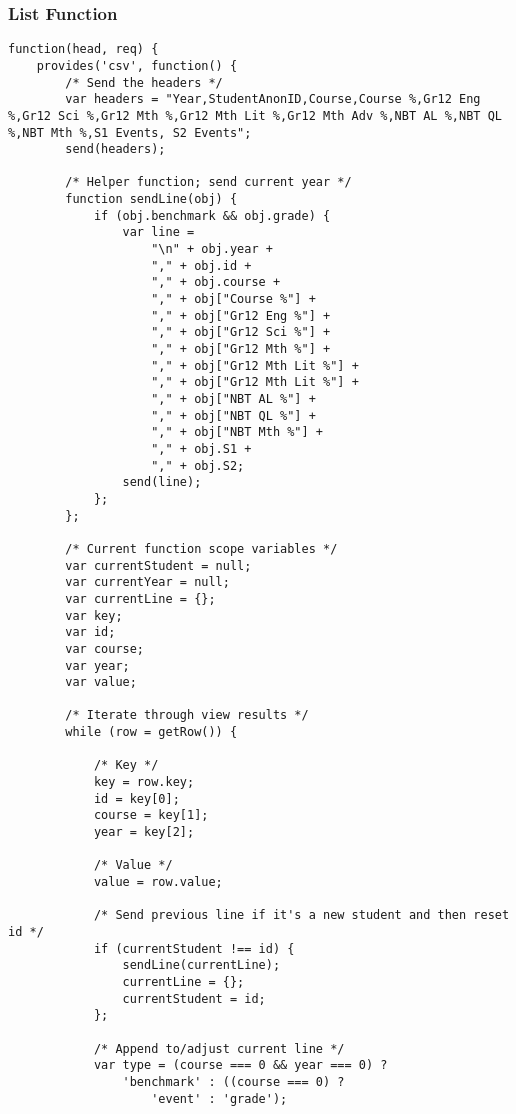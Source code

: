 \subsubsection{List Function}
\label{3-way-join-list-function}
\begin{verbatim}
function(head, req) {
    provides('csv', function() {
        /* Send the headers */
        var headers = "Year,StudentAnonID,Course,Course %,Gr12 Eng %,Gr12 Sci %,Gr12 Mth %,Gr12 Mth Lit %,Gr12 Mth Adv %,NBT AL %,NBT QL %,NBT Mth %,S1 Events, S2 Events";
        send(headers);

        /* Helper function; send current year */
        function sendLine(obj) {
            if (obj.benchmark && obj.grade) {
                var line =
                    "\n" + obj.year +
                    "," + obj.id +
                    "," + obj.course +
                    "," + obj["Course %"] +
                    "," + obj["Gr12 Eng %"] +
                    "," + obj["Gr12 Sci %"] +
                    "," + obj["Gr12 Mth %"] +
                    "," + obj["Gr12 Mth Lit %"] +
                    "," + obj["Gr12 Mth Lit %"] +
                    "," + obj["NBT AL %"] +
                    "," + obj["NBT QL %"] +
                    "," + obj["NBT Mth %"] +
                    "," + obj.S1 +
                    "," + obj.S2;
                send(line);
            };
        };

        /* Current function scope variables */
        var currentStudent = null;
        var currentYear = null;
        var currentLine = {};
        var key;
        var id;
        var course;
        var year;
        var value;

        /* Iterate through view results */
        while (row = getRow()) {

            /* Key */
            key = row.key;
            id = key[0];
            course = key[1];
            year = key[2];

            /* Value */
            value = row.value;

            /* Send previous line if it's a new student and then reset id */
            if (currentStudent !== id) {
                sendLine(currentLine);
                currentLine = {};
                currentStudent = id;
            };

            /* Append to/adjust current line */
            var type = (course === 0 && year === 0) ?
                'benchmark' : ((course === 0) ?
                    'event' : 'grade');


\end{verbatim}
